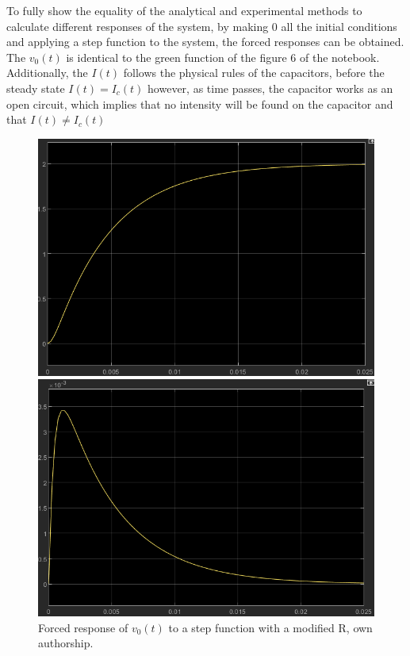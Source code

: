 \documentclass[a4paper,12pt]{article}
\begin{document}
\vspace{0.5cm}

To fully show the equality of the analytical and experimental methods to calculate different responses of the system, by making 0 all the initial conditions and applying a step function to the system, the forced responses can be obtained. The $v_0(t)$ is identical to the green function of the figure 6 of the notebook. Additionally, the $I(t)$ follows the physical rules of the capacitors, before the steady state $I(t) = I_c(t)$ however, as time passes, the capacitor works as an open circuit, which implies that no intensity will be found on the capacitor and that $I(t) \neq I_c(t)$

\vspace{0.5cm}

\begin{figure}[H]
    \centering
    \begin{minipage}[b]{0.45\linewidth}
        \centering
        \includegraphics[width=\linewidth]{fonts_lab_2/scope_v_step0.png}
        \caption{Forced response of $v_0(t)$ to a step function with a modified R, own authorship.}
        \label{fig:scopevstep0}
    \end{minipage}
    \hspace{0.05\linewidth} %
    \begin{minipage}[b]{0.45\linewidth}
        \centering
        \includegraphics[width=\linewidth]{fonts_lab_2/scope_i_step0.png}

\end{minipage}
\end{figure}
\end{document}
